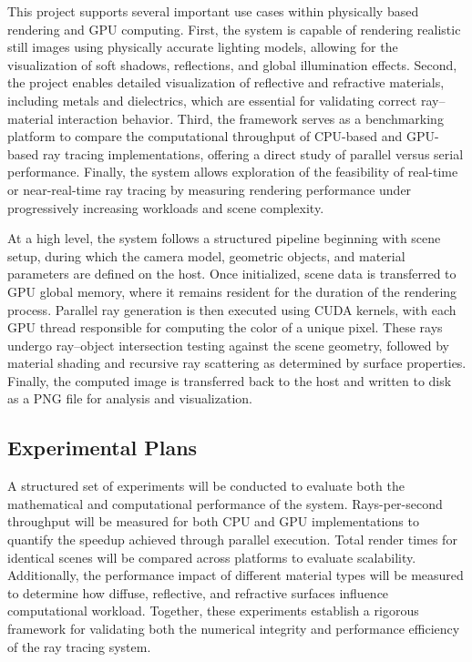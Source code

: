 \documentclass[11pt]{article}
\begin{document}
This project supports several important use cases within physically based rendering and GPU computing. First, the system is capable of rendering realistic still images using physically accurate lighting models, allowing for the visualization of soft shadows, reflections, and global illumination effects. Second, the project enables detailed visualization of reflective and refractive materials, including metals and dielectrics, which are essential for validating correct ray–material interaction behavior. Third, the framework serves as a benchmarking platform to compare the computational throughput of CPU-based and GPU-based ray tracing implementations, offering a direct study of parallel versus serial performance. Finally, the system allows exploration of the feasibility of real-time or near-real-time ray tracing by measuring rendering performance under progressively increasing workloads and scene complexity.


At a high level, the system follows a structured pipeline beginning with scene setup, during which the camera model, geometric objects, and material parameters are defined on the host. Once initialized, scene data is transferred to GPU global memory, where it remains resident for the duration of the rendering process. Parallel ray generation is then executed using CUDA kernels, with each GPU thread responsible for computing the color of a unique pixel. These rays undergo ray–object intersection testing against the scene geometry, followed by material shading and recursive ray scattering as determined by surface properties.  Finally, the computed image is transferred back to the host and written to disk as a PNG file for analysis and visualization.

\subsection*{Experimental Plans}

A structured set of experiments will be conducted to evaluate both the mathematical and computational performance of the system. Rays-per-second throughput will be measured for both CPU and GPU implementations to quantify the speedup achieved through parallel execution. Total render times for identical scenes will be compared across platforms to evaluate scalability. Additionally, the performance impact of different material types will be measured to determine how diffuse, reflective, and refractive surfaces influence computational workload. Together, these experiments establish a rigorous framework for validating both the numerical integrity and performance efficiency of the ray tracing system.
\end{document}
